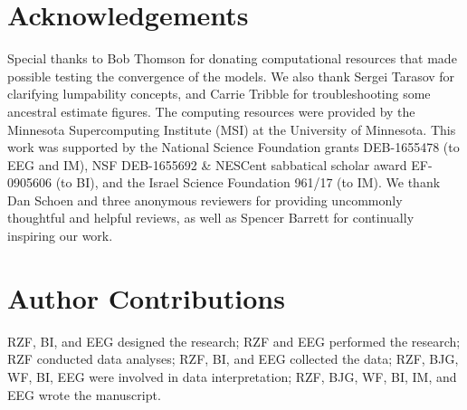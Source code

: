 \documentclass[11pt]{article}
\begin{document}
\clearpage






\section{Acknowledgements}
Special thanks to Bob Thomson for donating computational resources that made possible testing the convergence of the models. 
We also thank Sergei Tarasov for clarifying lumpability concepts, and Carrie Tribble for troubleshooting some ancestral estimate figures. 
The computing resources were provided by the Minnesota Supercomputing Institute (MSI) at the University of Minnesota.
This work was supported by the National Science Foundation grants DEB-1655478 (to EEG and IM), NSF DEB-1655692 \& NESCent sabbatical scholar award EF-0905606 (to BI), and the Israel Science Foundation 961/17 (to IM). %
We thank Dan Schoen and three anonymous reviewers for providing uncommonly thoughtful and helpful reviews, as well as Spencer Barrett for continually inspiring our work.

\section{Author Contributions}

RZF, BI, and EEG designed the research; RZF and EEG performed the research; RZF conducted data analyses; RZF, BI, and EEG collected the data; RZF, BJG, WF, BI, EEG were involved in data interpretation; RZF, BJG, WF, BI, IM, and EEG wrote the manuscript.


\clearpage



\setstretch{\stretchby}
\end{document}
